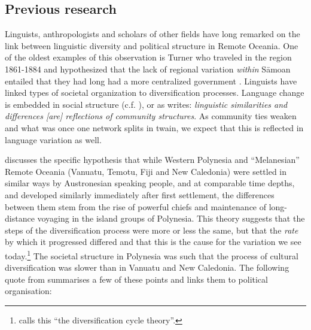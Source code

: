 \documentclass[a4paper,10pt]{article} %
\begin{document}

 
 
\subsection{Previous research}
\label{nonlingfactors}
Linguists, anthropologists and scholars of other fields have long remarked on the link between linguistic diversity and political structure in Remote Oceania. One of the oldest examples of this observation is Turner who traveled in the region 1861-1884 and hypothesized that the lack of regional variation \emph{within} S\={a}moan entailed that they had long had a more centralized government \citep[172]{turner1884}. Linguists have linked types of societal organization to diversification processes. Language change is embedded in social structure (c.f. \citep{WLH1968}), or as \citet[124]{grace_1992_aberrant} writes: \emph{linguistic similarities and differences [are] reflections of community structures}. As community ties weaken and what was once one network splits in twain, we expect that this is reflected in language variation as well.

\citet{pawley81, pawley2007} discusses the specific hypothesis that while Western Polynesia and ``Melanesian'' Remote Oceania (Vanuatu, Temotu, Fiji and New Caledonia) were settled in similar ways by Austronesian speaking people, and at comparable time depths, and developed similarly immediately after first settlement, the differences between them stem from the rise of powerful chiefs and maintenance of long-distance voyaging in the island groups of Polynesia. This theory suggests that the steps of the diversification process were more or less the same, but that the \emph{rate} by which it progressed differed and that this is the cause for the variation we see today.\footnote{\citet{lynch1981melanesian} calls this ``the diversification cycle theory''.} The societal structure in Polynesia was such that the process of cultural diversification was slower than in Vanuatu and New Caledonia. The following quote from \citet{pawley2007} summarises a few of these points and links them to political organisation:

\end{document}
